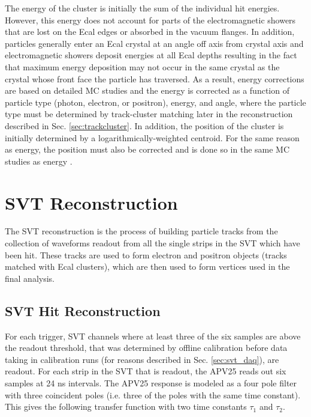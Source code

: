 The energy of the cluster is initially the sum of the individual hit energies. However, this energy does not account for parts of the electromagnetic showers that are lost on the Ecal edges or absorbed in the vacuum flanges. In addition, particles generally enter an Ecal crystal at an angle off axis from crystal axis and electromagnetic showers deposit energies at all Ecal depths resulting in the fact that maximum energy deposition may not occur in the same crystal as the crystal whose front face the particle has traversed. As a result, energy corrections are based on detailed MC studies and the energy is corrected as a function of particle type (photon, electron, or positron), energy, and angle, where the particle type must be determined by track-cluster matching later in the reconstruction described in Sec. \ref{sec:trackcluster}. In addition, the position of the cluster is initially determined by a logarithmically-weighted centroid. For the same reason as energy, the position must also be corrected and is done so in the same MC studies as energy \cite{ecalsim} \cite{ecalenergy}.

\clearpage

\section{SVT Reconstruction} \label{sec:svtrecon}

The SVT reconstruction is the process of building particle tracks from the collection of waveforms readout from all the single strips in the SVT which have been hit. These tracks are used to form electron and positron objects (tracks matched with Ecal clusters), which are then used to form vertices used in the final analysis.

\subsection{SVT Hit Reconstruction}
For each trigger, SVT channels where at least three of the six samples are above the readout threshold, that was determined by offline calibration before data taking in calibration runs (for reasons described in Sec. \ref{sec:svt_daq}), are readout. For each strip in the SVT that is readout, the APV25 reads out six samples at 24 ns intervals. The APV25 response is modeled as a four pole filter with three coincident poles (i.e. three of the poles with the same time constant). This gives the following transfer function with two time constants $\tau_1$ and $\tau_2$.

